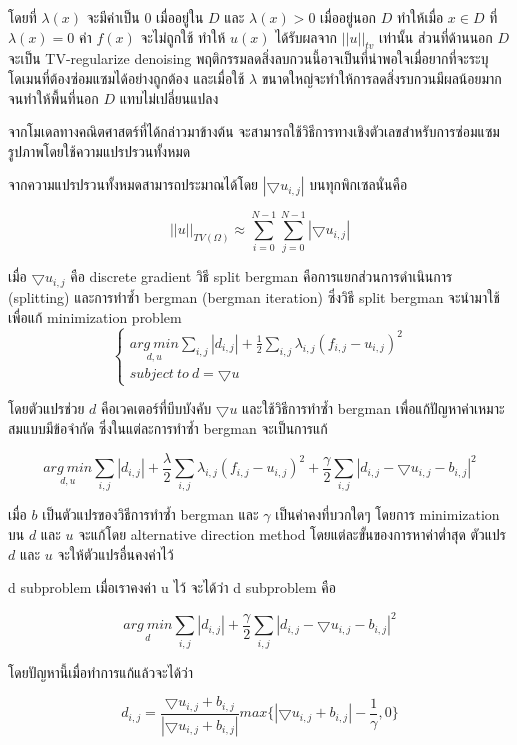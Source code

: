 \documentclass[hidelinks,a4paper,14pt]{article}
\numberwithin{equation}{section}							%
\begin{document}
{	โดยที่ $\lambda(x)$ จะมีค่าเป็น $0$ เมื่ออยู่ใน $D$ และ $\lambda(x)>0$ เมื่ออยู่นอก $D$  ทำให้เมื่อ $x \in D$ ที่ $\lambda(x)=0$ ค่า $f(x)$ จะไม่ถูกใช้ ทำให้ $u(x)$ ได้รับผลจาก $||u||_{tv}$ เท่านั้น ส่วนที่ด้านนอก $D$ จะเป็น TV-regularize denoising พฤติกรรมลดสิ่งลบกวนนี้อาจเป็นที่น่าพอใจเมื่อยากที่จะระบุโดเมนที่ต้องซ่อมแซมได้อย่างถูกต้อง และเมื่อใช้ $λ$ ขนาดใหญ่จะทำให้การลดสิ่งรบกวนมีผลน้อยมากจนทำให้พื้นที่นอก $D$  แทบไม่เปลี่ยนแปลง
	
	จากโมเดลทางคณิตศาสตร์ที่ได้กล่าวมาข้างต้น จะสามารถใช้วิธีการทางเชิงตัวเลขสำหรับการซ่อมแซมรูปภาพโดยใช้ความแปรปรวนทั้งหมด
	
	จากความแปรปรวนทั้งหมดสามารถประมาณได้โดย $ |\bigtriangledown u_{i,j} | $ บนทุกพิกเซลนั่นคือ
	
	$$ ||u||_{TV(\Omega)} \approx \sum_{i=0}^{N-1} \sum_{j=0}^{N-1} |\bigtriangledown u_{i,j}| $$
	
	เมื่อ $\bigtriangledown u_{i,j}$  คือ discrete gradient วิธี split bergman คือการแยกส่วนการดำเนินการ (splitting) และการทำซ้ำ bergman (bergman iteration) ซึ่งวิธี split bergman จะนำมาใช้เพื่อแก้ minimization problem
	$$
	\left\{ \begin{array}{lc} 
		\underset{d , u}{arg \ min}\sum_{i,j}|d_{i,j}|+\frac{1}{2}\sum_{i,j}\lambda_{i,j}(f_{i,j} - u_{i,j})^2 \\
		subject \ to \ d = \bigtriangledown u 
	\end{array} \right .
	$$

	โดยตัวแปรช่วย $d$  คือเวคเตอร์ที่บีบบังคับ $ \bigtriangledown u$ และใช้วิธีการทำซ้ำ bergman เพื่อแก้ปัญหาค่าเหมาะสมแบบมีข้อจำกัด ซึ่งในแต่ละการทำซ้ำ bergman จะเป็นการแก้
	
	$$\underset{d , u}{arg \ min}\sum_{i,j}|d_{i,j}|+\frac{\lambda}{2}\sum_{i,j}\lambda_{i,j}(f_{i,j} - u_{i,j})^2 + \frac{\gamma}{2} \sum_{i,j} |d_{i,j} - \bigtriangledown u_{i,j}- b_{i,j}|^2 $$
	
	เมื่อ $b$  เป็นตัวแปรของวิธีการทำซ้ำ bergman และ $\gamma$ เป็นค่าคงที่บวกใดๆ โดยการ minimization  บน $d$ และ $u$  จะแก้โดย alternative direction method โดยแต่ละขั้นของการหาค่าต่ำสุด ตัวแปร $d$ และ $u$ จะให้ตัวแปรอื่นคงค่าไว้
	
	d subproblem เมื่อเราคงค่า u ไว้ จะได้ว่า d subproblem คือ
	
	$$ \underset{d}{arg \ min} \sum_{i,j} |d_{i,j}| + \frac{\gamma}{2} \sum_{i,j}|d_{i,j} - \bigtriangledown u_{i,j} - b_{i,j}|^2$$
	
	โดยปัญหานี้เมื่อทำการแก้แล้วจะได้ว่า 
	
	$$ d_{i,j} = \frac{\bigtriangledown u_{i,j}  + b_{i,j} }{ | \bigtriangledown u_{i,j}  + b_{i,j} | } max \{  | \bigtriangledown u_{i,j}  + b_{i,j} | - \frac{1}{\gamma} , 0\} $$
	
}
\end{document}
